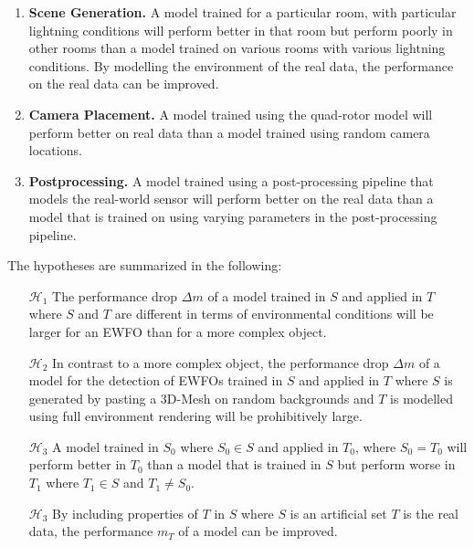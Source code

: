 \begin{enumerate}
	\item \textbf{Scene Generation.} A model trained for a particular room, with particular lightning conditions will perform better in that room but perform poorly in other rooms than a model trained on various rooms with various lightning conditions. By modelling the environment of the real data, the performance on the real data can be improved.
	
	\item \textbf{Camera Placement.} A model trained using the quad-rotor model will perform better on real data than a model trained using random camera locations.
	
	\item \textbf{Postprocessing.} A model trained using a post-processing pipeline that models the real-world sensor will perform better on the real data than a model that is trained on using varying parameters in the post-processing pipeline.  
\end{enumerate}

The hypotheses are summarized in the following:

\begin{enumerate}
	\item[$\mathcal{H}_1$] The performance drop $\Delta m$ of a model trained in $S$ and applied in $T$ where $S$ and $T$ are different in terms of environmental conditions will be larger for an \ac{EWFO} than for a more complex object.
	
	\item[$\mathcal{H}_2$] In contrast to a more complex object, the performance drop $\Delta m$ of a model for the detection of \acp{EWFO} trained in $S$ and applied in $T$ where $S$ is generated by pasting a 3D-Mesh on random backgrounds and $T$ is modelled using full environment rendering will be prohibitively large.
	
	\item[$\mathcal{H}_3$] A model trained in $S_0$ where $S_0 \in S$ and applied in $T_0$, where $S_0 = T_0$ will perform better in $T_0$ than a model that is trained in $S$ but perform worse in $T_1$ where $T_1 \in S$ and $T_1 \neq S_0$. 

	\item[$\mathcal{H}_3$] By including properties of $T$ in $S$ where $S$ is an artificial set $T$ is the real data, the performance $m_T$ of a model can be improved. 

\end{enumerate}

